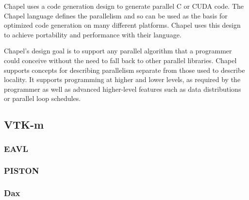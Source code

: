 Chapel uses a code generation design to generate parallel C or CUDA code.
%
The Chapel language defines the parallelism and so can be used as the basis for optimized code generation on many different platforms.
%
Chapel uses this design to achieve portability and performance with their language.

Chapel's design goal is to support any parallel algorithm that a programmer could conceive without the need to fall back to other parallel libraries.
%
Chapel supports concepts for describing parallelism separate from those used to describe locality.
%
It supports programming at higher and lower levels, as required by the programmer as well as advanced higher-level features such as data distributions or parallel loop schedules.
%
~\cite{bradchamberlain2013}


\subsection*{\textbf{VTK-m}}

\cite{moreland2015vtk}
\cite{moreland2014vtk}

\subsubsection*{EAVL}
\subsubsection*{PISTON} 
\subsubsection*{Dax}  
\cite{morelanddax}
\cite{moreland2011dax}
